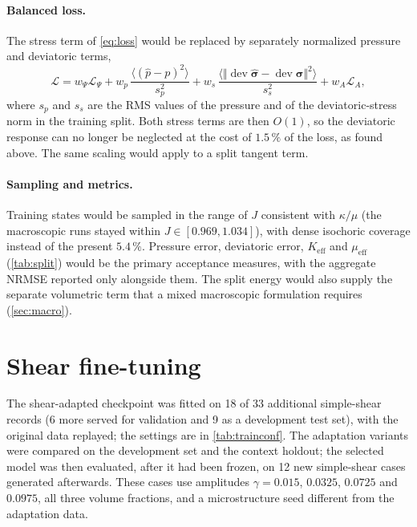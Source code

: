 \paragraph{Balanced loss.} The stress term of \cref{eq:loss} would be replaced by
separately normalized pressure and deviatoric terms,
\begin{equation}
  \mathcal L=w_\Psi\mathcal L_\Psi+w_p\,\frac{\langle(\hat p-p)^2\rangle}{s_p^2}
  +w_s\,\frac{\langle\Vert\operatorname{dev}\hat{\bm\sigma}-\operatorname{dev}\bm\sigma\Vert^2\rangle}{s_s^2}
  +w_A\mathcal L_A,
  \label{eq:loss-proposed}
\end{equation}
where $s_p$ and $s_s$ are the RMS values of the pressure and of the deviatoric-stress
norm in the training split. Both stress terms are then $O(1)$, so the deviatoric
response can no longer be neglected at the cost of $1.5\,\%$ of the loss, as found
above. The same scaling would apply to a split tangent term.

\paragraph{Sampling and metrics.} Training states would be sampled in the range of
$J$ consistent with $\kappa/\mu$ (the macroscopic runs stayed within
$J\in[0.969,1.034]$), with dense isochoric coverage instead of the present
$5.4\,\%$. Pressure error, deviatoric error, $K_{\mathrm{eff}}$ and $\mu_{\mathrm{eff}}$
(\cref{tab:split}) would be the primary acceptance measures, with the aggregate
NRMSE reported only alongside them. The split energy would also supply the separate
volumetric term that a mixed macroscopic formulation requires (\cref{sec:macro}).

\section{Shear fine-tuning}

The shear-adapted checkpoint was fitted on 18 of 33 additional simple-shear records
(6 more served for validation and 9 as a development test set), with the original data
replayed; the settings are in \cref{tab:trainconf}. The adaptation variants were compared on the
development set and the context holdout; the selected model was then evaluated, after it
had been frozen, on 12 new simple-shear cases generated afterwards. These cases use amplitudes
$\gamma=0.015$, $0.0325$, $0.0725$ and $0.0975$, all three volume fractions, and a
microstructure seed different from the adaptation data.

